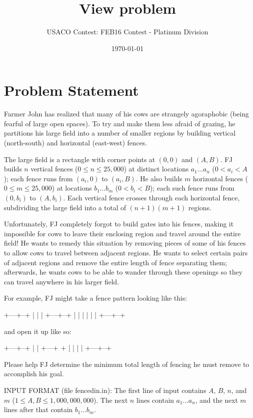 \documentclass[12pt]{article}
\title{View problem}
\author{USACO Contest: FEB16 Contest - Platinum Division}
\date{\today}
\begin{document}
\maketitle

\section*{Problem Statement}

Farmer John has realized that many of his cows are strangely agoraphobic (being
fearful of large open spaces). To try and make them less afraid of grazing, he
partitions his large field into a number of smaller regions by building vertical
(north-south) and horizontal (east-west) fences.  

The large field is a rectangle with corner points at $(0,0)$ and $(A,B)$.  FJ
builds $n$ vertical fences  ($0 \leq n \leq 25,000$) at distinct locations
$a_1 \ldots a_n$ ($0 < a_i < A$); each fence runs from $(a_i, 0)$ to $(a_i, B)$.
He also builds $m$ horizontal fences ($0 \leq m \leq 25,000$) at locations
$b_1 \ldots b_m$ ($0 < b_i < B$); each such fence runs from $(0, b_i)$ to
$(A, b_i)$. Each vertical fence crosses through each horizontal fence,
subdividing the large field into a  total of $(n+1)(m+1)$ regions.

Unfortunately, FJ completely forgot to build gates into his fences, making it
impossible for cows to leave their enclosing region and travel around the entire
field!  He wants to remedy this situation by removing pieces of some of his
fences to allow cows to travel between adjacent regions.  He wants to select
certain pairs of adjacent regions and remove the entire length of fence
separating them; afterwards, he wants cows to be able to wander through these
openings so they can travel anywhere in his larger field.

For example, FJ might take a fence pattern looking like this:


+---+--+
|   |  |
+---+--+
|   |  |  
|   |  |
+---+--+

and open it up like so:


+---+--+
|      |  
+---+  +  
|      |  
|      |
+---+--+

Please help FJ determine the minimum total length of fencing he must remove to
accomplish his goal.

INPUT FORMAT (file fencedin.in):
The first line of input contains $A$, $B$, $n$, and $m$
($1 \leq A, B \leq 1,000,000,000$). The next $n$ lines contain $a_1 \ldots a_n$,
and the next $m$ lines after that contain $b_1 \ldots b_m$.
\end{document}
